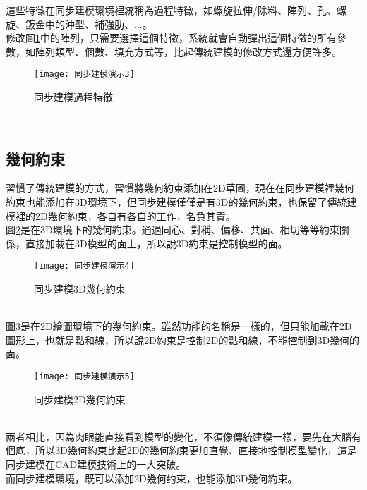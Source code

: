 這些特徵在同步建模環境裡統稱為過程特徵，如螺旋拉伸/除料、陣列、孔、螺旋、鈑金中的沖型、補強肋、...。\\

修改圖\ref{2.81}中的陣列，只需要選擇這個特徵，系統就會自動彈出這個特徵的所有參數，如陣列類型、個數、填充方式等，比起傳統建模的修改方式還方便許多。\\
\begin{figure}[hbt!]
\begin{center}
\texttt{[image: 同步建模演示3]}
\caption{\Large 同步建模過程特徵}\label{2.81}
\end{center}
\end{figure}
\\
\subsection{幾何約束}

習慣了傳統建模的方式，習慣將幾何約束添加在2D草圖，現在在同步建模裡幾何約束也能添加在3D環境下，但同步建模僅僅是有3D的幾何約束，也保留了傳統建模裡的2D幾何約束，各自有各自的工作，名負其責。\\

圖\ref{2.82}是在3D環境下的幾何約束。通過同心、對稱、偏移、共面、相切等等約束關係，直接加載在3D模型的面上，所以說3D約束是控制模型的面。\\
\begin{figure}[hbt!]
\begin{center}
\texttt{[image: 同步建模演示4]}
\caption{\Large 同步建模3D幾何約束}\label{2.82}
\end{center}
\end{figure}
\\
圖\ref{2.83}是在2D繪圖環境下的幾何約束。雖然功能的名稱是一樣的，但只能加載在2D圖形上，也就是點和線，所以說2D約束是控制2D的點和線，不能控制到3D幾何的面。\\
\begin{figure}[hbt!]
\begin{center}
\texttt{[image: 同步建模演示5]}
\caption{\Large 同步建模2D幾何約束}\label{2.83}
\end{center}
\end{figure}
\\
兩者相比，因為肉眼能直接看到模型的變化，不須像傳統建模一樣，要先在大腦有個底，所以3D幾何約束比起2D的幾何約束更加直覺、直接地控制模型變化，這是同步建模在CAD建模技術上的一大突破。\\
而同步建模環境，既可以添加2D幾何约束，也能添加3D幾何約束。\\

